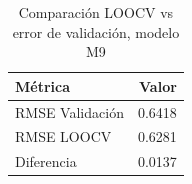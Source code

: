 \begin{table}[ht]
\centering
\begin{tabular}{lr}
  \toprule
Métrica & Valor \\ 
  \midrule
RMSE Validación & 0.6418 \\ 
  RMSE LOOCV & 0.6281 \\ 
  Diferencia & 0.0137 \\ 
   \bottomrule
\end{tabular}
\caption{Comparación LOOCV vs error de validación, modelo M9} 
\label{tab:loocv}
\end{table}
